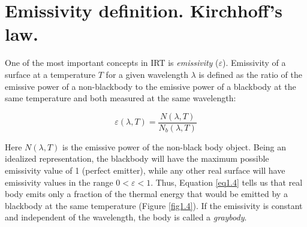 	\section{Emissivity definition. Kirchhoff's law.}\label{section1.3}
		
		One of the most important concepts in IRT is \textit{emissivity} ($\varepsilon$). Emissivity of a surface at a temperature $T$ for a given wavelength $\lambda$ is defined as the ratio of the emissive power of a non-blackbody to the emissive power of a blackbody at the same temperature and both measured at the same wavelength:
		
		\begin{equation}\label{eq1.4}
			\varepsilon(\lambda,T)=\frac{N(\lambda,T)}{N_{b}(\lambda,T)}
		\end{equation}\bigskip
		
		Here $N(\lambda,T)$ is the emissive power of the non-black body object. Being an idealized representation, the blackbody will have the maximum possible emissivity value of 1 (perfect emitter), while any other real surface will have emissivity values in the range $0 < \varepsilon < 1$. Thus, Equation \ref{eq1.4} tells us that real body emits only a fraction of the thermal energy that would be emitted by a blackbody at the same temperature (Figure \ref{fig1.4}). If the emissivity is constant and independent of the wavelength, the body is called a \textit{graybody}.
		

